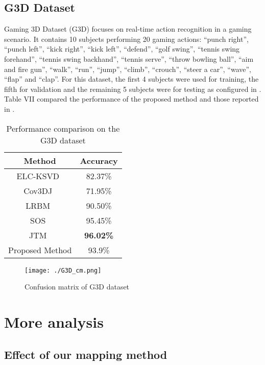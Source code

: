 \documentclass[10pt,journal]{IEEEtran}
\begin{document}
\subsection{G3D Dataset}
Gaming 3D Dataset (G3D)\cite{Bloom2012G3D} focuses on real-time action recognition in a gaming scenario. It contains 10 subjects performing 20 gaming actions: “punch right”, “punch left”, “kick right”, “kick left”, “defend”, “golf swing”, “tennis swing forehand”, “tennis swing backhand”, “tennis serve”, “throw bowling ball”, “aim and fire gun”, “walk”, “run”, “jump”, “climb”, “crouch”, “steer a car”, “wave”, “flap” and “clap”. For this dataset, the first 4 subjects were used for training, the fifth for validation and the remaining 5 subjects were for testing as configured in \cite{Nie2015A}. Table VII compared the performance of the proposed method and those reported in \cite{Nie2015A}.


\begin{table}[htb]
\begin{center}
\caption{Performance comparison on the G3D dataset \cite{Shahroudy2016NTU}} \label{tab:G3D}
\begin{tabular}{  c  c }
\hline
Method              &Accuracy \\
\hline
ELC-KSVD~\cite{Zhou2014Discriminative} &82.37\%\\
Cov3DJ~\cite{Hussein2013Human}  &71.95\%\\
LRBM~\cite{Nie2015A} & 90.50\%\\
SOS~\cite{Hou2016Skeleton}  &95.45\%\\
JTM~\cite{Wang2016Action}& \bf{96.02}\%\\
Proposed Method     & {93.9\%}\\
\hline
\end{tabular}
\end{center}
\end{table}

\begin{figure}[htb]
\centering
\texttt{[image: ./G3D\_cm.png]}
\caption{Confusion matrix of G3D dataset}
\label{fig:map}
\end{figure}




\section{More analysis}
\label{analysis}

\subsection{Effect of our mapping method}
\end{document}
